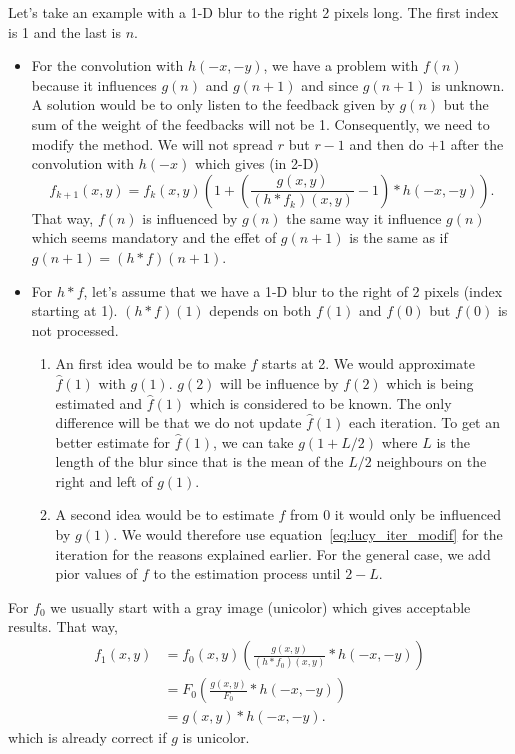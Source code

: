 Let's take an example with a 1-D blur to the right
2 pixels long. The first index is 1 and the last is $n$.
\begin{itemize}
  \item For the convolution with $h(-x,-y)$,
    we have a problem with $f(n)$ because it influences
    $g(n)$ and $g(n+1)$ and since $g(n+1)$ is unknown.
    A solution would be to only listen to the feedback given
    by $g(n)$ but the sum of the weight of the feedbacks
    will not be 1.
    Consequently, we need to modify the method.
    We will not spread $r$ but $r-1$ and then do $+1$
    after the convolution with $h(-x)$ which gives (in 2-D)
    \begin{equation}
      \label{eq:lucy_iter_modif}
      f_{k+1}(x,y) = f_k(x,y)\left(1+\left(\frac{g(x,y)}{(h*f_k)(x,y)}-1\right) * h(-x,-y)\right).
    \end{equation}
    That way, $f(n)$ is influenced by $g(n)$ the same
    way it influence $g(n)$ which seems mandatory and
    the effet of $g(n+1)$ is the same as if
    $g(n+1) = (h*f)(n+1)$.
  \item For $h * f$,
    let's assume that we have a 1-D blur to the right of 2 pixels
    (index starting at 1).
    $(h*f)(1)$ depends on both $f(1)$ and $f(0)$ but $f(0)$ is not processed.
    \begin{enumerate}
      \item An first idea would be to make $f$ starts at 2.
        We would approximate $\hat{f}(1)$ with $g(1)$.
        $g(2)$ will be influence by $f(2)$ which is being estimated
        and $\hat{f}(1)$ which is considered to be known.
        The only difference will be that we do not update $\hat{f}(1)$
        each iteration.
        To get an better estimate for $\hat{f}(1)$, we can take
        $g(1+L/2)$ where $L$ is the length of the blur since
        that is the mean of the $L/2$ neighbours on the right and left
        of $g(1)$.
      \item A second idea would be to estimate $f$ from 0
        it would only be influenced by $g(1)$.
        We would therefore use equation~\eqref{eq:lucy_iter_modif}
        for the iteration for the reasons explained earlier.
        For the general case, we add pior values of $f$ to the
        estimation process until $2-L$.
    \end{enumerate}
\end{itemize}

For $f_0$ we usually start with a gray image (unicolor) which gives acceptable results.
That way,
\begin{align*}
  f_1(x,y) & = f_0(x,y)\left(\frac{g(x,y)}{(h*f_0)(x,y)} * h(-x,-y)\right)\\
               & = F_0\left(\frac{g(x,y)}{F_0} * h(-x,-y)\right)\\
               & = g(x,y) * h(-x,-y).
\end{align*}
which is already correct if $g$ is unicolor.

